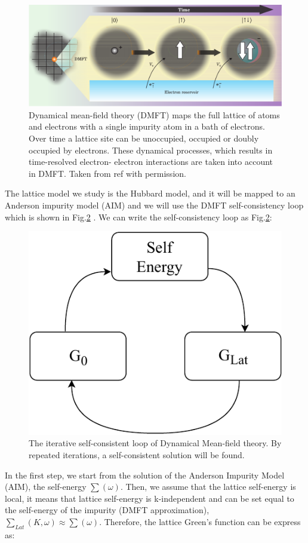 \begin{figure}[ht]
\centering
    \includegraphics[width=1 \linewidth]{fig2/mean_field.pdf}
     
\caption{ Dynamical mean-field theory (DMFT) maps the full lattice of atoms and electrons with a single impurity atom in a bath of electrons. Over time a lattice site can be unoccupied, occupied or doubly occupied by electrons. These dynamical processes, which results in time-resolved electron- electron interactions are taken into account in DMFT. Taken from ref \cite{Gabriel} with permission. \label{fig:mean_field}}
\end{figure} 


The lattice model we study is the Hubbard model, and it will be mapped to an Anderson impurity model (AIM) and we will use the DMFT self-consistency loop which is shown in Fig.\ref{fig:diagram} \cite{Antoine}. We can write the self-consistency loop as Fig.\ref{fig:diagram}: 

\begin{figure}[ht]
\centering
    \includegraphics[width=0.6 \linewidth]{fig2/diagram-crop.pdf}
     \caption{ The iterative self-consistent loop of Dynamical Mean-field theory. By repeated iterations, a self-consistent solution will be found.}
 \label{fig:diagram}
\end{figure} 

In the first step, we start from the solution of the Anderson Impurity Model (AIM), the self-energy $\sum (\omega)$. Then, we assume that the lattice self-energy is local, it means that lattice self-energy is k-independent and can be set equal to the self-energy of the impurity (DMFT approximation), $\sum_{Lat}(K,\omega) 	\approx \sum (\omega)$\cite{Antoine}. Therefore, the lattice Green's function can be express as:

